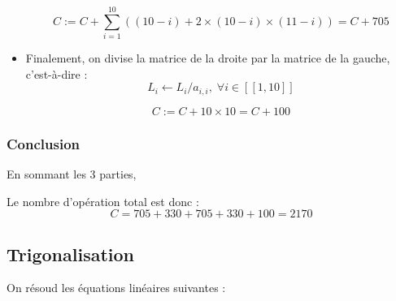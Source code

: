 \documentclass{article}
\begin{document}
\begin{itemize}
        \begin{tcolorbox}
        \[
        C := C + \sum_{i=1}^{10} ((10-i) + 2 \times  (10-i) \times  (11-i)) = C + 705
    \]
        \end{tcolorbox}
        
    \item Finalement, on divise la matrice de la droite par la matrice de la gauche, c'est-à-dire : $$L_i \leftarrow L_i / a_{i,i}, \; \forall i \in [\![1, 10]\!]$$
        
        \begin{tcolorbox}
        \[
        C := C + 10 \times 10 = C + 100
        \]
        \end{tcolorbox}
        

\end{itemize}

\subsubsection{Conclusion}

En sommant les 3 parties, 

\begin{tcolorbox}[title={Conclusion}, fonttitle = \bfseries \sffamily]
    Le nombre d'opération total est donc :
    \[
    C = 705 + 330  + 705 + 330 + 100 = 2170
    \]
    
\end{tcolorbox}

\newpage

\subsection{Trigonalisation}\label{3}

On résoud les équations linéaires suivantes :\\
\end{document}
